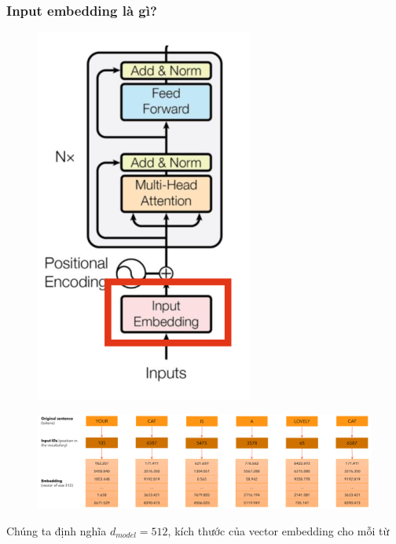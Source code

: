 \documentclass{book}
\begin{document}
            \subsubsection{Input embedding là gì?}
            \begin{figure}[H]
                \centering
                \includegraphics[width=0.27\linewidth]{images/12d_3.png}
        
            \end{figure}
            \begin{figure}[H]
                \centering
                \includegraphics[width=1.0\linewidth]{images/12d_4.png}
        
            \end{figure}
            Chúng ta định nghĩa $d_{model}=512$, kích thước của vector embedding cho mỗi từ\\
\end{document}
